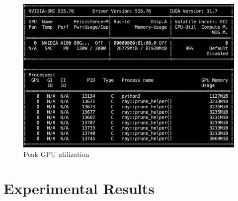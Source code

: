 \documentclass{article}
\begin{document}
\begin{figure}
	\centerline{\includegraphics[width=6in]{../proj1/figures/nvidia-smi_pruning.png}}
	\caption{Peak GPU utilization}
	\label{fig:nvidiasmi}
\end{figure}

\section{Experimental Results}
\end{document}
